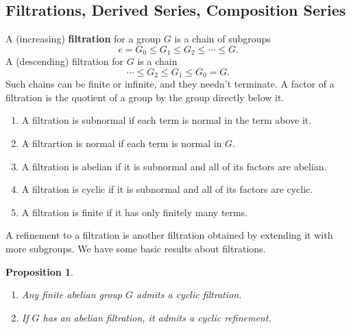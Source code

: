 \documentclass{report}
\newtheorem{proposition}{Proposition}
\begin{document}
\begin{singlespace}
\begin{enumerate}
\section{Filtrations, Derived Series, Composition Series}
  A (increasing) \textbf{filtration} for a group $G$ is a chain of subgroups
  \[e=G_0\leq G_1\leq G_2\leq \cdots\leq G.\]
  A (descending) filtration for $G$ is a chain
  \[
    \cdots\leq G_2\leq G_1\leq G_0=G.\]
  Such chains can be finite or infinite, and they needn't terminate. A factor of a filtration is the quotient of a group by the group directly below it.
  \begin{enumerate}
   \item A filtration is subnormal if each term is normal in the term above it.
   \item A filtrartion is normal if each term is normal in $G$.
   \item A filtration is abelian if it is subnormal and all of its factors are abelian.
   \item A filtration is cyclic if it is subnormal and all of its factors are cyclic.
   \item A filtration is finite if it has only finitely many terms.
  \end{enumerate}
  A refinement to a filtration is another filtration obtained by extending it with more subgroups. We have some basic results about filtrations.
  \begin{proposition}
    \begin{enumerate}
    \item Any finite abelian group $G$ admits a cyclic filtration.
    \item If $G$ has an abelian filtration, it admits a cyclic refinement.
    \end{enumerate}
  \end{proposition}
  

\end{enumerate}
\end{singlespace}
\end{document}

